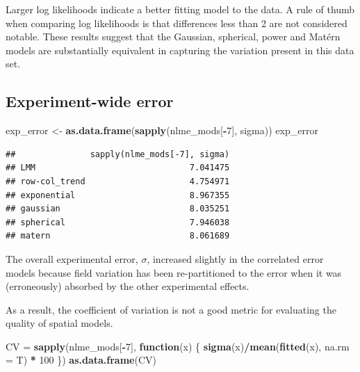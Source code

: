 \documentclass[
]{book}
\newenvironment{Shaded}{\begin{snugshade}}{\end{snugshade}}
\newcommand{\AttributeTok}[1]{\textcolor[rgb]{0.13,0.29,0.53}{#1}}
\newcommand{\ControlFlowTok}[1]{\textcolor[rgb]{0.13,0.29,0.53}{\textbf{#1}}}
\newcommand{\DecValTok}[1]{\textcolor[rgb]{0.00,0.00,0.81}{#1}}
\newcommand{\FunctionTok}[1]{\textcolor[rgb]{0.13,0.29,0.53}{\textbf{#1}}}
\newcommand{\NormalTok}[1]{#1}
\newcommand{\OtherTok}[1]{\textcolor[rgb]{0.56,0.35,0.01}{#1}}
\newcommand{\SpecialCharTok}[1]{\textcolor[rgb]{0.81,0.36,0.00}{\textbf{#1}}}
\begin{document}
Larger log likelihoods indicate a better fitting model to the data. A rule of thumb when comparing log likelihoods is that differences less than 2 are not considered notable. These results suggest that the Gaussian, spherical, power and Matérn models are substantially equivalent in capturing the variation present in this data set.

\hypertarget{experiment-wide-error}{%
\subsection{Experiment-wide error}\label{experiment-wide-error}}

\begin{Shaded}
\begin{Highlighting}[]
\NormalTok{exp\_error }\OtherTok{\textless{}{-}} \FunctionTok{as.data.frame}\NormalTok{(}\FunctionTok{sapply}\NormalTok{(nlme\_mods[}\SpecialCharTok{{-}}\DecValTok{7}\NormalTok{], sigma))}
\NormalTok{exp\_error}
\end{Highlighting}
\end{Shaded}

\begin{verbatim}
##               sapply(nlme_mods[-7], sigma)
## LMM                               7.041475
## row-col_trend                     4.754971
## exponential                       8.967355
## gaussian                          8.035251
## spherical                         7.946038
## matern                            8.061689
\end{verbatim}

The overall experimental error, \(\sigma\), increased slightly in the correlated error models because field variation has been re-partitioned to the error when it was (erroneously) absorbed by the other experimental effects.

As a result, the coefficient of variation is not a good metric for evaluating the quality of spatial models.

\begin{Shaded}
\begin{Highlighting}[]
\NormalTok{CV }\OtherTok{=} \FunctionTok{sapply}\NormalTok{(nlme\_mods[}\SpecialCharTok{{-}}\DecValTok{7}\NormalTok{], }\ControlFlowTok{function}\NormalTok{(x) \{}
  \FunctionTok{sigma}\NormalTok{(x)}\SpecialCharTok{/}\FunctionTok{mean}\NormalTok{(}\FunctionTok{fitted}\NormalTok{(x), }\AttributeTok{na.rm =}\NormalTok{ T) }\SpecialCharTok{*} \DecValTok{100}
\NormalTok{\})}
\FunctionTok{as.data.frame}\NormalTok{(CV)}
\end{Highlighting}
\end{Shaded}
\end{document}
